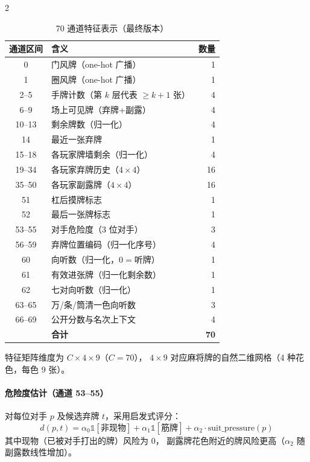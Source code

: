 \documentclass{article}
\begin{document}
\begin{multicols}{2}
\begin{table}[H]
\centering
\caption{70 通道特征表示（最终版本）}
\label{tab:features}
\small
\setlength{\tabcolsep}{4pt}
\begin{tabular}{clr}
\toprule
通道区间 & 含义 & 数量 \\
\midrule
0       & 门风牌（one-hot 广播）     & 1  \\
1       & 圈风牌（one-hot 广播）     & 1  \\
2--5    & 手牌计数（第 $k$ 层代表 $\geq\!k\!+\!1$ 张）& 4  \\
6--9    & 场上可见牌（弃牌+副露）    & 4  \\
10--13  & 剩余牌数（归一化）         & 4  \\
14      & 最近一张弃牌               & 1  \\
15--18  & 各玩家牌墙剩余（归一化）   & 4  \\
19--34  & 各玩家弃牌历史（$4\times4$）& 16 \\
35--50  & 各玩家副露牌（$4\times4$） & 16 \\
51      & 杠后摸牌标志               & 1  \\
52      & 最后一张牌标志             & 1  \\
53--55  & 对手危险度（3 位对手）     & 3  \\
56--59  & 弃牌位置编码（归一化序号） & 4  \\
60      & 向听数（归一化，$0\!=\!$听牌）& 1  \\
61      & 有效进张牌（归一化剩余数） & 1  \\
62      & 七对向听数（归一化）       & 1  \\
63--65  & 万/条/筒清一色向听数       & 3  \\
66--69  & 公开分数与名次上下文       & 4  \\
\midrule
        & \textbf{合计}              & \textbf{70} \\
\bottomrule
\end{tabular}
\end{table}

特征矩阵维度为 $C \times 4 \times 9$（$C=70$），
$4\times9$ 对应麻将牌的自然二维网格（4 种花色，每色 9 张）。

\paragraph{危险度估计（通道 53--55）}
对每位对手 $p$ 及候选弃牌 $t$，采用启发式评分：
\begin{equation}
d(p,t) = \alpha_0 \mathbb{1}[\text{非现物}]
        + \alpha_1 \mathbb{1}[\text{筋牌}]
        + \alpha_2 \cdot \text{suit\_pressure}(p)
\label{eq:danger}
\end{equation}
其中现物（已被对手打出的牌）风险为 0，
副露牌花色附近的牌风险更高（$\alpha_2$ 随副露数线性增加）。


\end{multicols}
\end{document}
